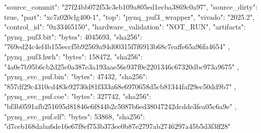 \begin{codeblock}
{
  "source_commit": "27f24bb072f53c3eb109a805ed1ecba3869c0a97",
  "source_dirty": true,
  "part": "xc7z020clg400-1",
  "top": "pynq_puf3_wrapper",
  "vivado": "2025.2",
  "control_id": "0x33465150",
  "hardware_validation": "NOT_RUN",
  "artifacts": {
    "pynq_puf3.bit": {
      "bytes": 4045693,
      "sha256": "769ed24c4ef4b155eccf5b92569a94d00315f7f6913b68c7eaffe65a96fa4654"
    },
    "pynq_puf3.hwh": {
      "bytes": 158472,
      "sha256": "4a0e7b95b6cb2d25c0a387e3a193aae56e937f0e2201346c67320dbc973a9675"
    },
    "pynq_svc_puf.bin": {
      "bytes": 47432,
      "sha256": "857df29c4310cd483e92730d81f333a68e6970658d5cb81344faf29ec50dd9b7"
    },
    "pynq_svc_puf.coe": {
      "bytes": 327742,
      "sha256": "bf3b0591afb251695d81846e6f844b2c5087b6ed38047242dcdde3fea05c6a9e"
    },
    "pynq_svc_puf.elf": {
      "bytes": 53868,
      "sha256": "d7ceb168daba6de16e67f8ef753b373ee0b87e2797ab2746297a45b5d3f3ff28"
    }
  }
}
\end{codeblock}
